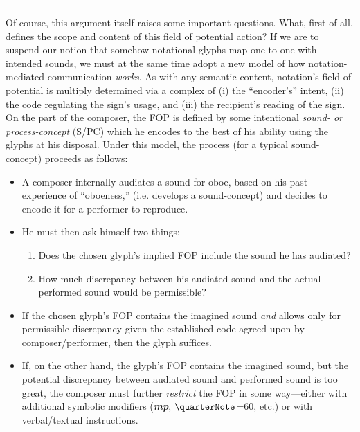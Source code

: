     \begin{center}
    \noindent\rule{3cm}{0.4pt}
    \end{center}   

    Of course, this argument itself raises some important questions. What, first of all, defines the scope and content of this field of potential action? If we are to suspend our notion that somehow notational glyphs map one-to-one with intended sounds, we must at the same time adopt a new model of how notation-mediated communication \textit{works}. As with any semantic content, notation's field of potential is multiply determined via a complex of (i) the ``encoder's'' intent, (ii) the code regulating the sign's usage, and (iii) the recipient's reading of the sign. On the part of the composer, the FOP is defined by some intentional \textit{sound- or process-concept} (S/PC) which he encodes to the best of his ability using the glyphs at his disposal. Under this model, the process (for a typical sound-concept) proceeds as follows:

        \begin{smallquote}
            \begin{itemize}[label=--]
                \item A composer internally audiates a sound for oboe, based on his past experience of ``oboeness,'' (i.e. develops a sound-concept) and decides to encode it for a performer to reproduce.
                \item He must then ask himself two things:
                    \begin{enumerate}
                        \item Does the chosen glyph's implied FOP include the sound he has audiated?
                        \item How much discrepancy between his audiated sound and the actual performed sound would be permissible?
                    \end{enumerate}
                \item If the chosen glyph's FOP contains the imagined sound \textit{and} allows only for permissible discrepancy given the established code agreed upon by composer/performer, then the glyph suffices.
                \item If, on the other hand, the glyph's FOP contains the imagined sound, but the potential discrepancy between audiated sound and performed sound is too great, the composer must further \textit{restrict} the FOP in some way---either with additional symbolic modifiers (\textbf{\textit{mp}}, $\quarterNote$=60, etc.) or with verbal/textual instructions.
            \end{itemize}
        \end{smallquote}

